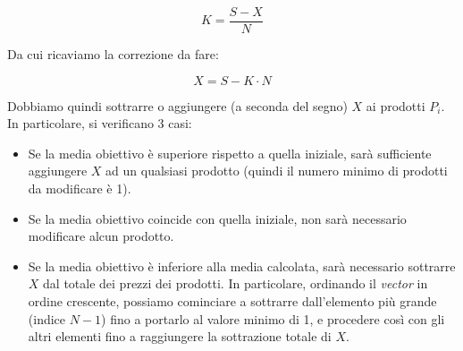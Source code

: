 \[
K = \frac{S-X}{N}
\]

Da cui ricaviamo la correzione da fare:

\[
	X = S - K\cdot N
\]

Dobbiamo quindi sottrarre o aggiungere (a seconda del segno) $X$ ai prodotti $P_i$.
In particolare, si verificano 3 casi:

\begin{itemize}
	\item Se la media obiettivo è superiore rispetto a quella iniziale, sarà sufficiente aggiungere $X$ ad un qualsiasi prodotto (quindi il numero minimo di prodotti da modificare è 1).
	\item Se la media obiettivo coincide con quella iniziale, non sarà necessario modificare alcun prodotto.
	\item Se la media obiettivo è inferiore alla media calcolata, sarà necessario sottrarre $X$ dal totale dei prezzi dei prodotti. In particolare, ordinando il \emph{vector} in ordine crescente, possiamo cominciare a sottrarre dall’elemento più grande (indice $N−1$) fino a portarlo al valore minimo di 1, e procedere così con gli altri elementi fino a raggiungere la sottrazione totale di $X$.
\end{itemize}


